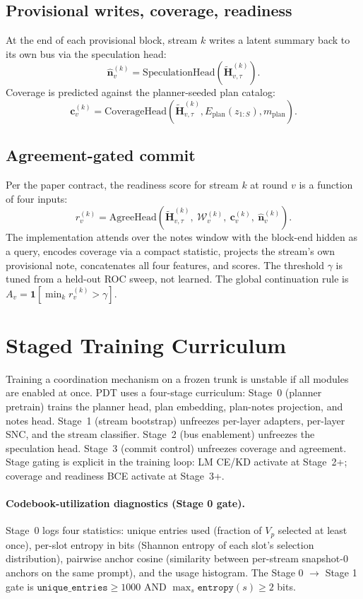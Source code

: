 \subsection{Provisional writes, coverage, readiness}

At the end of each provisional block, stream $k$ writes a latent summary back to its own bus via the speculation head:
\[
\widehat{\mathbf{n}}^{(k)}_v = \mathrm{SpeculationHead}(\widetilde{\mathbf{H}}^{(k)}_{v,\tau}).
\]
Coverage is predicted against the planner-seeded plan catalog:
\[
\mathbf{c}^{(k)}_v = \mathrm{CoverageHead}(\widetilde{\mathbf{H}}^{(k)}_{v,\tau}, E_{\text{plan}}(z_{1:S}), m_{\text{plan}}).
\]

\subsection{Agreement-gated commit}

Per the paper contract, the readiness score for stream $k$ at round $v$ is a function of four inputs:
\[
r^{(k)}_v = \mathrm{AgreeHead}\!\left(\widetilde{\mathbf{H}}^{(k)}_{v,\tau},\ \mathcal{W}^{(k)}_v,\ \mathbf{c}^{(k)}_v,\ \widehat{\mathbf{n}}^{(k)}_v\right).
\]
The implementation attends over the notes window with the block-end hidden as a query, encodes coverage via a compact statistic, projects the stream's own provisional note, concatenates all four features, and scores. The threshold $\gamma$ is tuned from a held-out ROC sweep, not learned. The global continuation rule is $A_v = \mathbf{1}\!\left[\min_{k} r^{(k)}_v > \gamma\right]$.

\section{Staged Training Curriculum}
\label{sec:curriculum}

Training a coordination mechanism on a frozen trunk is unstable if all modules are enabled at once. PDT uses a four-stage curriculum: Stage~0 (planner pretrain) trains the planner head, plan embedding, plan-notes projection, and notes head. Stage~1 (stream bootstrap) unfreezes per-layer adapters, per-layer SNC, and the stream classifier. Stage~2 (bus enablement) unfreezes the speculation head. Stage~3 (commit control) unfreezes coverage and agreement. Stage gating is explicit in the training loop: LM CE/KD activate at Stage~2+; coverage and readiness BCE activate at Stage~3+.

\paragraph{Codebook-utilization diagnostics (Stage 0 gate).} Stage~0 logs four statistics: unique entries used (fraction of $V_p$ selected at least once), per-slot entropy in bits (Shannon entropy of each slot's selection distribution), pairwise anchor cosine (similarity between per-stream snapshot-0 anchors on the same prompt), and the usage histogram. The Stage 0 $\to$ Stage 1 gate is $\texttt{unique\_entries} \ge 1000$ AND $\max_s \texttt{entropy}(s) \ge 2$ bits.

